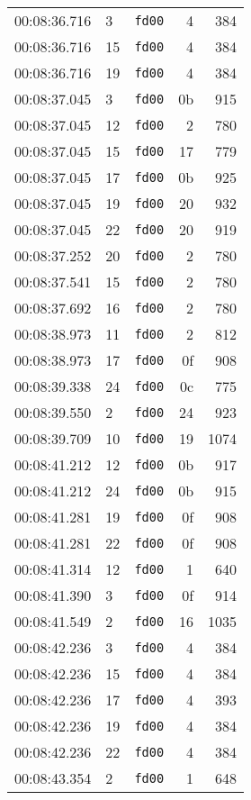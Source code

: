 \documentclass{article}
\begin{document}
\begin{longtable}{lllrr}
00:08:36.716 & 3 & \texttt{fd00} & 4 & 384 \\
00:08:36.716 & 15 & \texttt{fd00} & 4 & 384 \\
00:08:36.716 & 19 & \texttt{fd00} & 4 & 384 \\
00:08:37.045 & 3 & \texttt{fd00} & 0b & 915 \\
00:08:37.045 & 12 & \texttt{fd00} & 2 & 780 \\
00:08:37.045 & 15 & \texttt{fd00} & 17 & 779 \\
00:08:37.045 & 17 & \texttt{fd00} & 0b & 925 \\
00:08:37.045 & 19 & \texttt{fd00} & 20 & 932 \\
00:08:37.045 & 22 & \texttt{fd00} & 20 & 919 \\
00:08:37.252 & 20 & \texttt{fd00} & 2 & 780 \\
00:08:37.541 & 15 & \texttt{fd00} & 2 & 780 \\
00:08:37.692 & 16 & \texttt{fd00} & 2 & 780 \\
00:08:38.973 & 11 & \texttt{fd00} & 2 & 812 \\
00:08:38.973 & 17 & \texttt{fd00} & 0f & 908 \\
00:08:39.338 & 24 & \texttt{fd00} & 0c & 775 \\
00:08:39.550 & 2 & \texttt{fd00} & 24 & 923 \\
00:08:39.709 & 10 & \texttt{fd00} & 19 & 1074 \\
00:08:41.212 & 12 & \texttt{fd00} & 0b & 917 \\
00:08:41.212 & 24 & \texttt{fd00} & 0b & 915 \\
00:08:41.281 & 19 & \texttt{fd00} & 0f & 908 \\
00:08:41.281 & 22 & \texttt{fd00} & 0f & 908 \\
00:08:41.314 & 12 & \texttt{fd00} & 1 & 640 \\
00:08:41.390 & 3 & \texttt{fd00} & 0f & 914 \\
00:08:41.549 & 2 & \texttt{fd00} & 16 & 1035 \\
00:08:42.236 & 3 & \texttt{fd00} & 4 & 384 \\
00:08:42.236 & 15 & \texttt{fd00} & 4 & 384 \\
00:08:42.236 & 17 & \texttt{fd00} & 4 & 393 \\
00:08:42.236 & 19 & \texttt{fd00} & 4 & 384 \\
00:08:42.236 & 22 & \texttt{fd00} & 4 & 384 \\
00:08:43.354 & 2 & \texttt{fd00} & 1 & 648 \\

\end{longtable}
\end{document}
